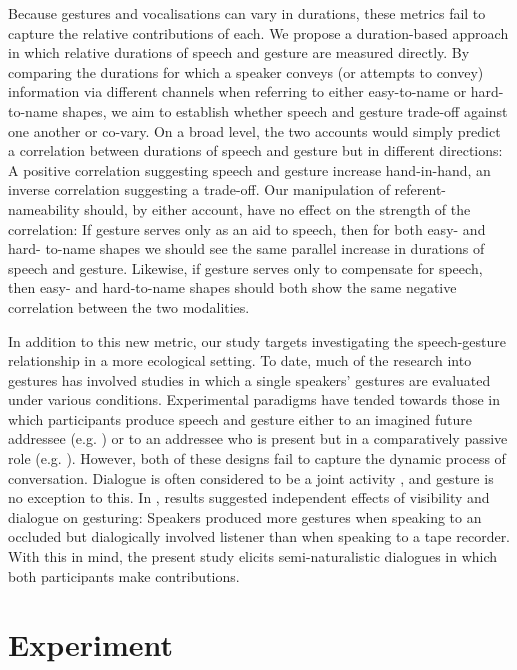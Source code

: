 \documentclass[a4paper,man,natbib]{apa6}
\begin{document}
Because gestures and vocalisations can vary in durations, these metrics fail to capture the relative contributions of each.
We propose a duration-based approach in which relative durations of speech and gesture are measured directly.
By comparing the durations for which a speaker conveys (or attempts to convey) information via different channels when referring to either easy-to-name or hard-to-name shapes, we aim to establish whether speech and gesture trade-off against one another or co-vary.
On a broad level, the two accounts would simply predict a correlation between durations of speech and gesture but in different directions: A positive correlation suggesting speech and gesture increase hand-in-hand, an inverse correlation suggesting a trade-off.
Our manipulation of referent-nameability should, by either account, have no effect on the strength of the correlation: If gesture serves only as an aid to speech, then for both easy- and hard- to-name shapes we should see the same parallel increase in durations of speech and gesture. 
Likewise, if gesture serves only to compensate for speech, then easy- and hard-to-name shapes should both show the same negative correlation between the two modalities. 


In addition to this new metric, our study targets investigating the speech-gesture relationship in a more ecological setting. 
To date, much of the research into gestures has involved studies in which a single speakers' gestures are evaluated under various conditions.
Experimental paradigms have tended towards those in which participants produce speech and gesture either to an imagined future addressee (e.g. \citet{Morsella2004, Wesp2001}) or to an addressee who is present but in a comparatively passive role (e.g. \citet{DeRuiter2012, Bangerter2004, Holler2007, Hoetjes2015}).
However, both of these designs fail to capture the dynamic process of conversation. 
Dialogue is often considered to be a joint activity \citep{Clark1996}, and gesture is no exception to this.
In \citet{Bavelas2008}, results suggested independent effects of visibility and dialogue on gesturing: Speakers produced more gestures when speaking to an occluded but dialogically involved listener than when speaking to a tape recorder. 
With this in mind, the present study elicits semi-naturalistic dialogues in which both participants make contributions. 


\section{Experiment}
\end{document}
